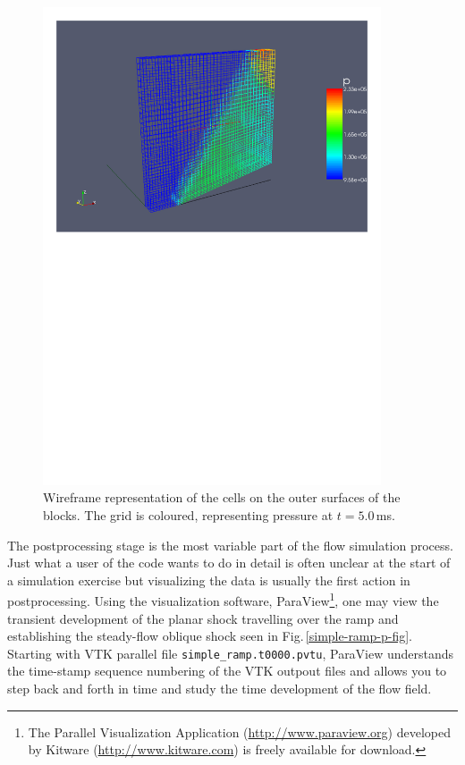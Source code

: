 \begin{figure}[htbp]
\begin{center}
\includegraphics[width=10cm,viewport=27 444 571 818]{../3D/simple_ramp/simple-ramp-wire-frame-p.pdf}
\end{center}
\caption{Wireframe representation of the cells on the outer surfaces of the blocks.
  The grid is coloured, representing pressure at $t = 5.0$\,ms.}
\label{simple-ramp-wireframe-fig}
\end{figure}

\medskip
The postprocessing stage is the most variable part of the flow simulation
process.
Just what a user of the code wants to do in detail is often unclear at the
start of a simulation exercise but visualizing the data is usually the first
action in postprocessing.
Using the visualization software, ParaView\footnote{The Parallel Visualization
  Application (\url{http://www.paraview.org}) developed by Kitware
  (\url{http://www.kitware.com}) is freely available for download.},
one may view the transient development of the planar shock travelling over the
ramp and establishing the steady-flow oblique shock seen in
Fig.\,\ref{simple-ramp-p-fig}.
Starting with VTK parallel file \texttt{simple\_ramp.t0000.pvtu}, 
ParaView understands the time-stamp sequence
numbering of the VTK outpout files and allows you to step back and forth in
time and study the time development of the flow field.

